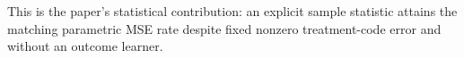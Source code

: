 This is the paper's statistical contribution: an explicit sample statistic attains the matching parametric MSE rate despite fixed nonzero treatment-code error and without an outcome learner.